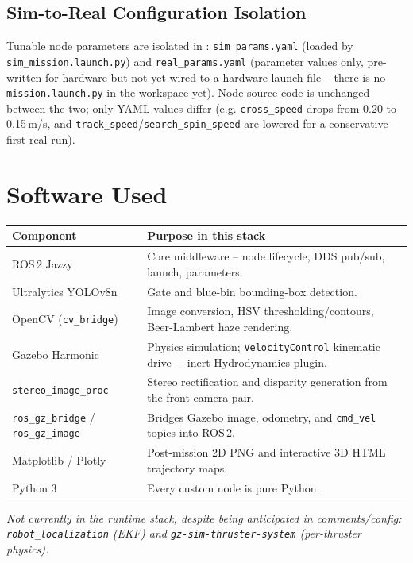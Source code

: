 \documentclass[10.5pt,a4paper]{article}
\newcommand{\hl}[1]{\tikz[baseline=(t.base)]{\node[fill=codeorange,rounded corners=2pt,inner sep=2pt,font=\ttfamily\scriptsize,text=codeorangetxt] (t) {#1};}}
\newcommand{\code}[1]{\texttt{\small\color{accent}#1}}
\begin{document}
\subsection{Sim-to-Real Configuration Isolation}

Tunable node parameters are isolated in \hl{auv\_bringup/config/}: \code{sim\_params.yaml}
(loaded by \code{sim\_mission.launch.py}) and \code{real\_params.yaml} (parameter values
only, pre-written for hardware but not yet wired to a hardware launch file -- there is no
\code{mission.launch.py} in the workspace yet). Node source code is unchanged between the
two; only YAML values differ (e.g. \code{cross\_speed} drops from 0.20 to 0.15\,m/s, and
\code{track\_speed}/\code{search\_spin\_speed} are lowered for a conservative first real run).

\section{Software Used}

\begin{table}[H]\centering\small
\begin{tabularx}{\textwidth}{L{4cm} X}
\toprule
{}\textbf{Component} & \textbf{Purpose in this stack} \\
\midrule
ROS\,2 Jazzy & Core middleware -- node lifecycle, DDS pub/sub, launch, parameters. \\
Ultralytics YOLOv8n & Gate and blue-bin bounding-box detection. \\
OpenCV (\code{cv\_bridge}) & Image conversion, HSV thresholding/contours, Beer-Lambert haze rendering. \\
Gazebo Harmonic & Physics simulation; \code{VelocityControl} kinematic drive + inert Hydrodynamics plugin. \\
\code{stereo\_image\_proc} & Stereo rectification and disparity generation from the front camera pair. \\
\code{ros\_gz\_bridge} / \code{ros\_gz\_image} & Bridges Gazebo image, odometry, and \code{cmd\_vel} topics into ROS\,2. \\
Matplotlib / Plotly & Post-mission 2D PNG and interactive 3D HTML trajectory maps. \\
Python 3 & Every custom node is pure Python. \\
\bottomrule
\end{tabularx}
\end{table}
{\sloppy\small\itshape Not currently in the runtime stack, despite being anticipated in
comments/config: \code{robot\_localization} (EKF) and \code{gz-sim-thruster-system}
(per-thruster physics).\par}
\end{document}
